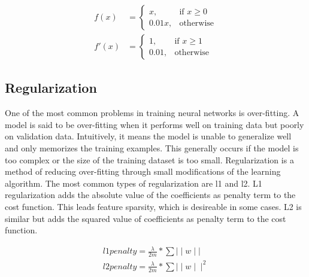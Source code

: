 \begin{equation}
    \label{eq:leakyrelu}
    \begin{aligned}
    f(x) &=
    \begin{cases}
        x, & \text{if } x\geq 0 \\
        0.01x, & \text{otherwise}
    \end{cases} \\
    f'(x) &=
    \begin{cases}
        1, & \text{if } x\geq 1 \\
        0.01, & \text{otherwise}
    \end{cases}
    \end{aligned}
\end{equation}

\begin{figure}[h!]
    \hfill
\end{figure}


\subsection{Regularization}
One of the most common problems in training neural networks is over-fitting. A model is said to be over-fitting when it performs well on training data but poorly on validation data. Intuitively, it means the model is unable to generalize well and only memorizes the training examples.
This generally occurs if the model is too complex or the size of the training dataset is too small.
Regularization is a method of reducing over-fitting through small modifications of the learning algorithm. The most common types of regularization are l1 and l2. L1 regularization adds the absolute value of the coefficients as penalty term to the cost function. This leads feature sparsity, which is desireable in some cases. L2 is similar but adds the squared value of coefficients as penalty term to the cost function. 

\begin{equation}
    \label{eq:l1l2}
    \begin{aligned}
    l1 penalty = \frac{\lambda}{2m} * \sum{\mid\mid w \mid\mid} \\
    l2 penalty =  \frac{\lambda}{2m} * \sum{\mid\mid w \mid\mid^2}
    \end{aligned}
\end{equation}

